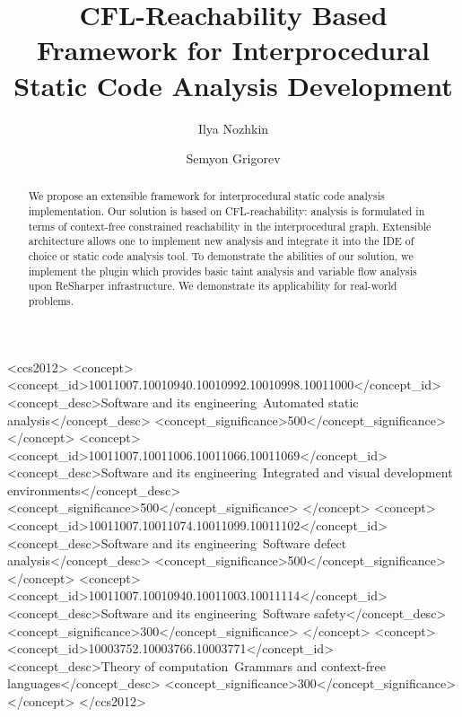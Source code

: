 \documentclass[sigconf]{acmart}
\begin{document}
\title[CFL-Reachability for Interprocedural Static Code Analysis Development]{CFL-Reachability Based Framework for Interprocedural Static Code Analysis Development}

\author{Ilya Nozhkin}

\author{Semyon Grigorev}


\begin{abstract}
We propose an extensible framework for interprocedural static code analysis implementation.
Our solution is based on CFL-reachability: analysis is formulated in terms of context-free constrained reachability in the interprocedural graph.
Extensible architecture allows one to implement new analysis and integrate it into the IDE of choice or static code analysis tool.
To demonstrate the abilities of our solution, we implement the plugin which provides basic taint analysis and variable flow analysis upon ReSharper infrastructure.
We demonstrate its applicability for real-world problems.
\end{abstract}


\begin{CCSXML}
<ccs2012>
<concept>
<concept_id>10011007.10010940.10010992.10010998.10011000</concept_id>
<concept_desc>Software and its engineering~Automated static analysis</concept_desc>
<concept_significance>500</concept_significance>
</concept>
<concept>
<concept_id>10011007.10011006.10011066.10011069</concept_id>
<concept_desc>Software and its engineering~Integrated and visual development environments</concept_desc>
<concept_significance>500</concept_significance>
</concept>
<concept>
<concept_id>10011007.10011074.10011099.10011102</concept_id>
<concept_desc>Software and its engineering~Software defect analysis</concept_desc>
<concept_significance>500</concept_significance>
</concept>
<concept>
<concept_id>10011007.10010940.10011003.10011114</concept_id>
<concept_desc>Software and its engineering~Software safety</concept_desc>
<concept_significance>300</concept_significance>
</concept>
<concept>
<concept_id>10003752.10003766.10003771</concept_id>
<concept_desc>Theory of computation~Grammars and context-free languages</concept_desc>
<concept_significance>300</concept_significance>
</concept>
</ccs2012>
\end{CCSXML}
\end{document}
